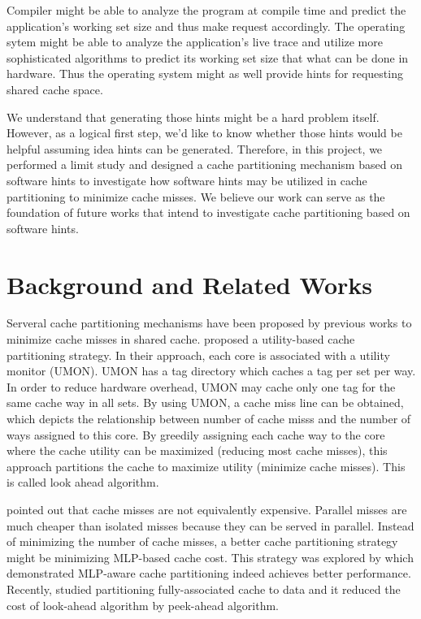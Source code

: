 \documentclass{acm_proc_article-sp}
\begin{document}
Compiler might be able to analyze the program at compile time and predict the 
application's working set size and thus make request accordingly. The operating
sytem might be able to analyze the application's live trace and utilize more 
sophisticated algorithms to predict its working set size that what can be done
in hardware. Thus the operating system might as well provide hints for 
requesting shared cache space.

We understand that generating those hints might be a hard problem itself. 
However, as a logical first step, we'd like to know whether those hints would 
be helpful assuming idea hints can be generated. Therefore, in this project, we 
performed a limit study and designed a cache partitioning mechanism based on 
software hints to investigate how software hints may be utilized in cache 
partitioning to minimize cache misses. We believe our work can serve as the 
foundation of future works that intend to investigate cache partitioning based
on software hints.

\section{Background and Related Works}

Serveral cache partitioning mechanisms have been proposed by previous works 
to minimize cache misses in shared cache.
\cite{Qureshi:2006:UCP:1194816.1194855} proposed a utility-based cache 
partitioning strategy. In their approach, each core is associated with a utility
monitor (UMON). UMON has a tag directory which caches a tag per set per way. 
In order to reduce hardware overhead, UMON may cache only one tag for the same 
cache way in all sets. By using UMON, a cache miss line can be obtained, which 
depicts the relationship between number of cache misss and the number of ways 
assigned to this core. By greedily assigning each cache way to the core where 
the cache utility can be maximized (reducing most cache misses), this approach
partitions the cache to maximize utility (minimize cache misses). This is called
look ahead algorithm.

\cite{Qureshi:2006:CMC:1150019.1136501} pointed out that cache misses are not 
equivalently expensive. Parallel misses are much cheaper than isolated misses 
because they can be served in parallel. Instead of minimizing the number of 
cache misses, a better cache partitioning strategy might be minimizing MLP-based
cache cost. This strategy was explored by \cite{conf/IEEEpact/MoretoCRV07} which
demonstrated MLP-aware cache partitioning indeed achieves better performance.
Recently, \cite{conf/IEEEpact/BeckmannS13} studied partitioning fully-associated
cache to data and it reduced the cost of look-ahead algorithm by peek-ahead 
algorithm.
\end{document}
